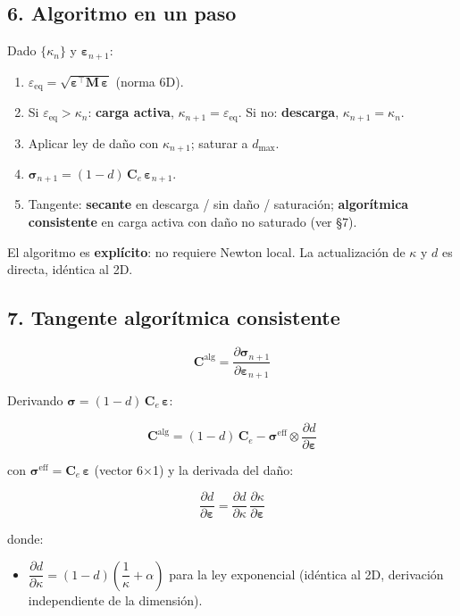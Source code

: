 \documentclass[11pt,letterpaper,oneside]{report}
\begin{document}
\subsection{6. Algoritmo en un paso}

Dado $\{\kappa_n\}$ y $\boldsymbol\varepsilon_{n+1}$:

\begin{enumerate}
  \item $\varepsilon_\text{eq} = \sqrt{\boldsymbol\varepsilon^\top \mathbf M\,\boldsymbol\varepsilon}$ (norma 6D).
  \item Si $\varepsilon_\text{eq} > \kappa_n$: \textbf{carga activa}, $\kappa_{n+1} = \varepsilon_\text{eq}$. Si no: \textbf{descarga}, $\kappa_{n+1} = \kappa_n$.
  \item Aplicar ley de daño con $\kappa_{n+1}$; saturar a $d_\text{max}$.
  \item $\boldsymbol\sigma_{n+1} = (1 - d)\,\mathbf C_e\,\boldsymbol\varepsilon_{n+1}$.
  \item Tangente: \textbf{secante} en descarga / sin daño / saturación; \textbf{algorítmica consistente} en carga activa con daño no saturado (ver §7).
\end{enumerate}

El algoritmo es \textbf{explícito}: no requiere Newton local. La actualización de $\kappa$ y $d$ es directa, idéntica al 2D.

\subsection{7. Tangente algorítmica consistente}

\[
\mathbf C^\text{alg} = \frac{\partial \boldsymbol\sigma_{n+1}}{\partial \boldsymbol\varepsilon_{n+1}}
\]

Derivando $\boldsymbol\sigma = (1-d)\,\mathbf C_e\,\boldsymbol\varepsilon$:

\[
\mathbf C^\text{alg} = (1-d)\,\mathbf C_e - \boldsymbol\sigma^\text{eff} \otimes \frac{\partial d}{\partial \boldsymbol\varepsilon}
\]

con $\boldsymbol\sigma^\text{eff} = \mathbf C_e\,\boldsymbol\varepsilon$ (vector 6\ensuremath{\times}1) y la derivada del daño:

\[
\frac{\partial d}{\partial \boldsymbol\varepsilon} = \frac{\partial d}{\partial \kappa}\,\frac{\partial \kappa}{\partial \boldsymbol\varepsilon}
\]

donde:

\begin{itemize}
  \item $\dfrac{\partial d}{\partial \kappa} = (1 - d)\left(\dfrac{1}{\kappa} + \alpha\right)$ para la ley exponencial (idéntica al 2D, derivación independiente de la dimensión).
\end{itemize}
\end{document}
